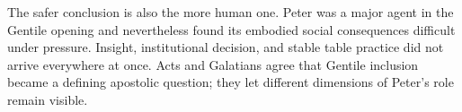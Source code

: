 The safer conclusion is also the more human one. Peter was a major agent in
the Gentile opening and nevertheless found its embodied social consequences
difficult under pressure. Insight, institutional decision, and stable table
practice did not arrive everywhere at once. Acts and Galatians agree that
Gentile inclusion became a defining apostolic question; they let different
dimensions of Peter's role remain visible.


